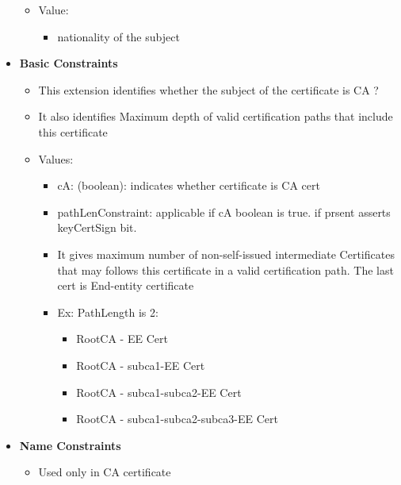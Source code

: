 \documentclass[a4paper]{article}
\begin{document}
\begin{itemize}
\begin{itemize}
                    \item Value:
                        \begin{itemize}
                            \item nationality of the subject
                        \end{itemize}
                \end{itemize}
            \item \textbf{Basic Constraints}
                \begin{itemize}
                    \item This extension identifies whether the subject of the certificate is CA ?
                    \item It also identifies Maximum depth of valid certification paths that include this certificate
                    \item Values:
                        \begin{itemize}
                            \item cA: (boolean): indicates whether certificate is CA cert
                            \item pathLenConstraint: applicable if cA boolean is true. if prsent asserts keyCertSign bit. 
                            \item It gives maximum number of non-self-issued intermediate Certificates that may follows this certificate in a valid certification path. The last cert is End-entity certificate
                            \item Ex: PathLength is 2:
                                \begin{itemize}
                                    \item RootCA - EE Cert
                                    \item RootCA - subca1-EE Cert
                                    \item RootCA - subca1-subca2-EE Cert
                                    \item RootCA - subca1-subca2-subca3-EE Cert
                                \end{itemize}
                        \end{itemize}
                \end{itemize}
            \item \textbf{Name Constraints}
                \begin{itemize}
                    \item Used only in CA certificate

\end{itemize}
\end{itemize}
\end{document}
